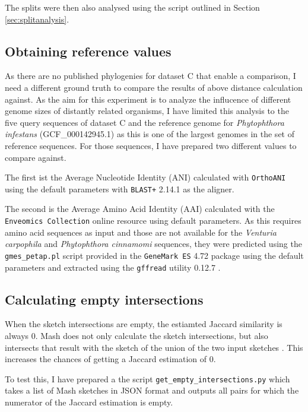 The splits were then also analysed using the script outlined in Section
\ref{sec:splitanalysis}.

\subsection*{Obtaining reference values}
As there are no published phylogenies for dataset C that enable a comparison, I
need a different ground truth to compare the results of above distance
calculation against. As the aim for this experiment is to analyze the influcence
of different genome sizes of distantly related organisms, I have limited this
analysis to the five query sequences of dataset C and the reference genome for
\textit{Phytophthora infestans} (GCF\_000142945.1) as this is one of the largest
genomes in the set of reference sequences. For those sequences, I have prepared
two different values to compare against.

The first ist the Average Nucleotide Identity (ANI)
\cite{konstantinidisGenomeBasedTaxonomyProkaryotes2005} calculated with
\texttt{OrthoANI} \cite{leeOrthoANIImprovedAlgorithm2016} using the default
parameters with \texttt{BLAST+} 2.14.1
\cite{camachoBLASTArchitectureApplications2009} as the aligner.

The second is the Average Amino Acid Identity (AAI) calculated with the
\texttt{Enveomics Collection} online resource
\cite{rodriguez-rEnveomicsCollectionToolbox2016} using default parameters. As
this requires amino acid sequences as input and those are not available for the
\textit{Venturia carpophila} and \textit{Phytophthora cinnamomi} sequences, they
were predicted using the \texttt{gmes\_petap.pl} script provided in the
\texttt{GeneMark ES} 4.72 package \cite{lomsadzeGeneIdentificationNovel2005}
using the default parameters and extracted using the \texttt{gffread} utility
0.12.7 \cite{perteaGFFUtilitiesGffRead2020}.


\subsection*{Calculating empty intersections}
When the sketch intersections are empty, the estiamted Jaccard similarity is
always 0. Mash does not only calculate the sketch intersections, but also
intersects that result with the sketch of the union of the two input sketches
\cite{ondovMashFastGenome2016}. This increases the chances of getting a Jaccard
estimation of 0. 

To test this, I have prepared a the script \texttt{get\_empty\_intersections.py}
which takes a list of Mash sketches in JSON format and outputs all pairs for
which the numerator of the Jaccard estimation is empty.

